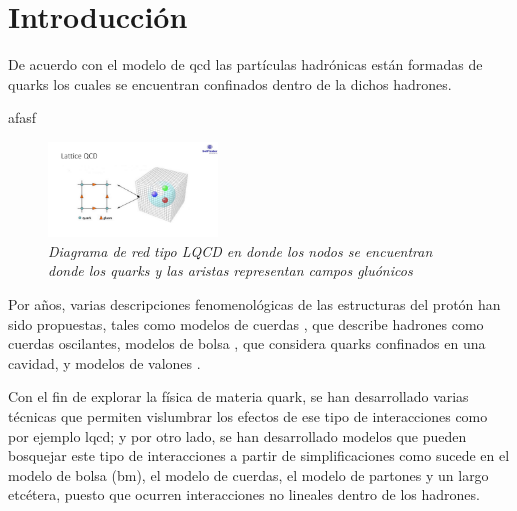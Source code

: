 \chapter*{Introducción}

De acuerdo con el modelo de \acrfull{qcd} las partículas hadrónicas están formadas de quarks los cuales se encuentran confinados dentro de la dichos hadrones.

afasf

\begin{figure}
\centering
\includegraphics[width=0.4\textwidth]{./Images/LQCD.jpg}
\caption[Red LQCD]{\emph{Diagrama de red tipo LQCD en donde los nodos se encuentran donde los quarks y las aristas representan campos gluónicos}}
\label{fig: LQCD}
\end{figure}

Por años, varias descripciones fenomenológicas de las estructuras del protón han sido propuestas, tales como modelos de cuerdas \cite{Artru1974, Andersson_1983}, que describe hadrones como cuerdas oscilantes, modelos de bolsa \cite{AIHPA_1968__8_2_163_0,DeTar_1983}, que considera quarks confinados en una cavidad, y modelos de valones \cite{Hwa_1981}.

Con el fin de explorar la física de materia quark, se han desarrollado varias técnicas que permiten vislumbrar los efectos de ese tipo de interacciones como por ejemplo \acrfull{lqcd}; y por otro lado, se han desarrollado modelos que pueden bosquejar este tipo de interacciones a partir de simplificaciones como sucede en el modelo de bolsa (\acrfull{bm}), el modelo de cuerdas, el modelo de partones y un largo etcétera\cite{DeTar_1983}, puesto que ocurren interacciones no lineales dentro de los hadrones. 


